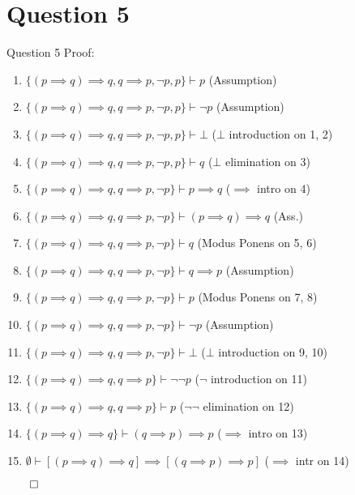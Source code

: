 \documentclass{beamer}
\begin{document}
    \section{Question 5}
    {
        \begin{frame}{Question 5}
            Proof:         
            \begin{enumerate}
                \item $\{(p \implies q) \implies q, q \implies p, \neg p, p\} \vdash p$ (Assumption)
                \item $\{(p \implies q) \implies q, q \implies p, \neg p, p\} \vdash \neg p$ (Assumption)
                \item $\{(p \implies q) \implies q, q \implies p, \neg p, p\} \vdash \bot$ ($\bot$ introduction on 1, 2)
                \item $\{(p \implies q) \implies q, q \implies p, \neg p, p\} \vdash q$ ($\bot$ elimination on 3)
                \item $\{(p \implies q) \implies q, q \implies p, \neg p\} \vdash p \implies q$ ($\implies$ intro on 4)
                \item $\{(p \implies q) \implies q, q \implies p, \neg p\} \vdash (p \implies q) \implies q$ (Ass.)
                \item $\{(p \implies q) \implies q, q \implies p, \neg p\} \vdash q$ (Modus Ponens on 5, 6)
                \item $\{(p \implies q) \implies q, q \implies p, \neg p\} \vdash q \implies p$ (Assumption)
                \item $\{(p \implies q) \implies q, q \implies p, \neg p\} \vdash p$ (Modus Ponens on 7, 8)
                \item $\{(p \implies q) \implies q, q \implies p, \neg p\} \vdash \neg p$ (Assumption)
                \item $\{(p \implies q) \implies q, q \implies p, \neg p\} \vdash \bot$ ($\bot$ introduction on 9, 10)
                \item $\{(p \implies q) \implies q, q \implies p\} \vdash \neg \neg p$ ($\neg$ introduction on 11)
                \item $\{(p \implies q) \implies q, q \implies p\} \vdash p$ ($\neg \neg$ elimination on 12)
                \item $\{(p \implies q) \implies q\} \vdash (q \implies p) \implies p$ ($\implies$ intro on 13)
                \item $\emptyset \vdash \left[(p \implies q) \implies q\right] \implies \left[(q \implies p) \implies p\right]$ ($\implies$ intr on 14)
            \end{enumerate}
            $\qed$
        \end{frame}
    }
\end{document}
